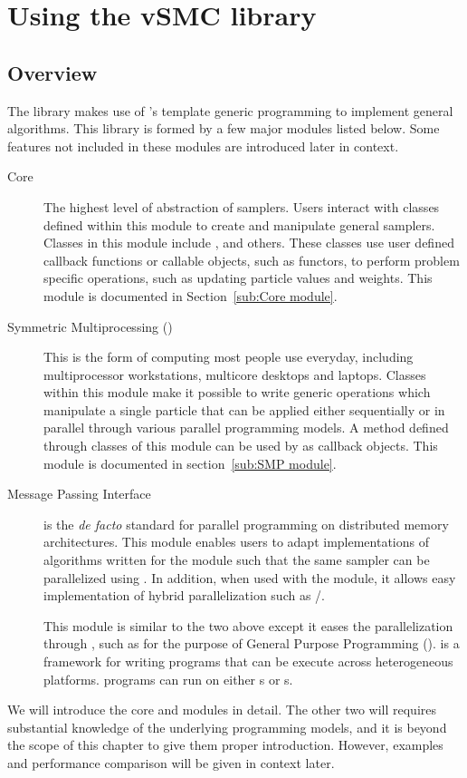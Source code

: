 \section{Using the vSMC library}
\label{sec:Using the vSMC library}

\subsection{Overview}

The \vsmc library makes use of \cpp's template generic programming to
implement general \smc algorithms. This library is formed by a few major
modules listed below. Some features not included in these modules are
introduced later in context.
\begin{description}
  \item[Core] The highest level of abstraction of \smc samplers. Users
    interact with classes defined within this module to create and manipulate
    general \smc samplers. Classes in this module include ,
     and others. These classes use user defined callback
    functions or callable objects, such as functors, to perform problem
    specific operations, such as updating particle values and weights. This
    module is documented in Section~\ref{sub:Core module}.
  \item[Symmetric Multiprocessing (\smp)] This is the form of computing most
    people use everyday, including multiprocessor workstations, multicore
    desktops and laptops. Classes within this module make it possible to write
    generic operations which manipulate a single particle that can be applied
    either sequentially or in parallel through various parallel programming
    models. A method defined through classes of this module can be used by
     as callback objects. This module is documented in
    section~\ref{sub:SMP module}.
  \item[Message Passing Interface] \mpi is the \emph{de facto} standard for
    parallel programming on distributed memory architectures. This module
    enables users to adapt implementations of algorithms written for the \smp
    module such that the same sampler can be parallelized using \mpi. In
    addition, when used with the \smp module, it allows easy implementation of
    hybrid parallelization such as \mpi/\openmp.
  \item[\opencl] This module is similar to the two above except it eases the
    parallelization through \opencl, such as for the purpose of General
    Purpose \gpu Programming (\gpgpu). \opencl is a framework for writing
    programs that can be execute across heterogeneous platforms. \opencl
    programs can run on either \cpu{}s or \gpu{}s.
\end{description}
We will introduce the core and \smp modules in detail. The other two will
requires substantial knowledge of the underlying programming models, and it is
beyond the scope of this chapter to give them proper introduction. However,
examples and performance comparison will be given in context later.

